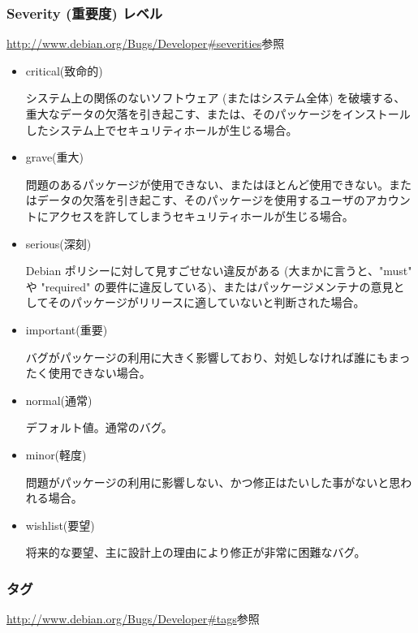 \documentclass[mingoth,a4paper]{jsarticle}
\begin{document}
\subsubsection{Severity (重要度) レベル}

\url{http://www.debian.org/Bugs/Developer#severities}参照

\begin{itemize}
\item critical(致命的)

システム上の関係のないソフトウェア (またはシステム全体) を破壊する、重大なデータの欠落を引き起こす、または、そのパッケージをインストールしたシステム上でセキュリティホールが生じる場合。 

\item grave(重大)

問題のあるパッケージが使用できない、またはほとんど使用できない。またはデータの欠落を引き起こす、そのパッケージを使用するユーザのアカウントにアクセスを許してしまうセキュリティホールが生じる場合。 

\item serious(深刻)

Debian ポリシーに対して見すごせない違反がある (大まかに言うと、"must" や "required" の要件に違反している)、またはパッケージメンテナの意見としてそのパッケージがリリースに適していないと判断された場合。 

\item important(重要)

バグがパッケージの利用に大きく影響しており、対処しなければ誰にもまったく使用できない場合。 

\item normal(通常)

デフォルト値。通常のバグ。 

\item minor(軽度)

問題がパッケージの利用に影響しない、かつ修正はたいした事がないと思われる場合。 

\item wishlist(要望)

将来的な要望、主に設計上の理由により修正が非常に困難なバグ。
\end{itemize}

\subsubsection{タグ}

\url{http://www.debian.org/Bugs/Developer#tags}参照
\end{document}
